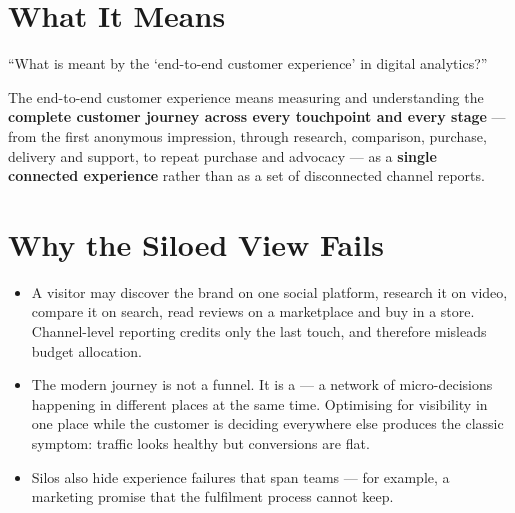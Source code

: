 \section{What It Means}

\begin{exambox}
``What is meant by the `end-to-end customer experience' in digital analytics?''

The end-to-end customer experience means measuring and understanding the
\textbf{complete customer journey across every touchpoint and every stage} ---
from the first anonymous impression, through research, comparison, purchase,
delivery and support, to repeat purchase and advocacy --- as a \textbf{single
connected experience} rather than as a set of disconnected channel reports.
\end{exambox}

\section{Why the Siloed View Fails}

\begin{itemize}
\item A visitor may discover the brand on one social platform, research it on
      video, compare it on search, read reviews on a marketplace and buy in a
      store. Channel-level reporting credits only the last touch, and therefore
      misleads budget allocation.
\item The modern journey is not a funnel. It is a  --- a network of micro-decisions
      happening in different places at the same time. Optimising for visibility in
      one place while the customer is deciding everywhere else produces the classic
      symptom: traffic looks healthy but conversions are flat.
\item Silos also hide experience failures that span teams --- for example, a
      marketing promise that the fulfilment process cannot keep.
\end{itemize}


